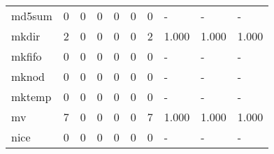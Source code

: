\begin{longtable}{lp{2.0cm}p{2.0cm}p{2.0cm}p{2.0cm}p{2.0cm}p{2.0cm}p{2.0cm}p{2.0cm}p{2.0cm}}
md5sum    &                      0 &                                  0 &                                 0 &                                0 &                                 0 &                               0 &                                    - &                                      - &                                    - \\
mkdir     &                      2 &                                  0 &                                 0 &                                0 &                                 0 &                               2 &                                1.000 &                                  1.000 &                                1.000 \\
mkfifo    &                      0 &                                  0 &                                 0 &                                0 &                                 0 &                               0 &                                    - &                                      - &                                    - \\
mknod     &                      0 &                                  0 &                                 0 &                                0 &                                 0 &                               0 &                                    - &                                      - &                                    - \\
mktemp    &                      0 &                                  0 &                                 0 &                                0 &                                 0 &                               0 &                                    - &                                      - &                                    - \\
mv        &                      7 &                                  0 &                                 0 &                                0 &                                 0 &                               7 &                                1.000 &                                  1.000 &                                1.000 \\
nice      &                      0 &                                  0 &                                 0 &                                0 &                                 0 &                               0 &                                    - &                                      - &                                    - \\

\end{longtable}
